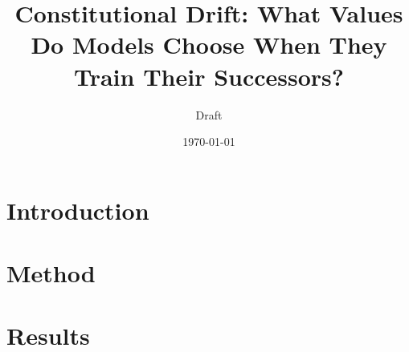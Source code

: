\documentclass[11pt]{article}
\title{Constitutional Drift: What Values Do Models Choose When They Train Their Successors?}
\author{Draft}
\date{\today}
\begin{document}
\maketitle

\section{Introduction}

\section{Method}

\section{Results}

\appendix

\end{document}
